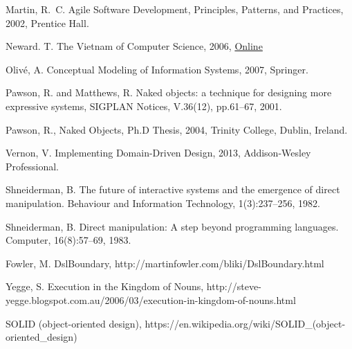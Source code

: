 \documentclass[a4paper,10pt,oneside,openright,final]{memoir} %
\begin{document}
\begin{thebibliography}{5}
Martin, R.~C. Agile Software Development, Principles, Patterns, and Practices, 2002, Prentice Hall.

New\-ard. T. The Vietnam of Computer Science, 2006,
\href{http://blogs.tedneward.com/2006/06/26/The+Vietnam+Of+Computer+Science.aspx}{Online}

Oliv\'{e}, A. Conceptual Modeling of Information Systems, 2007, Springer.

Pawson, R. and Matthews, R. Naked objects: a technique for designing more expressive systems, SIGPLAN Notices, V.36(12), pp.61--67, 2001.

Pawson, R., Naked Objects, Ph.D Thesis, 2004, Trinity College, Dublin, Ireland.

Vernon, V. Implementing Domain-Driven Design, 2013, Addison-Wesley Professional.

Shneiderman, B. The future of interactive systems and the emergence of direct manipulation. Behaviour and Information Technology, 1(3):237–256, 1982.

Shneiderman, B. Direct manipulation: A step beyond programming languages. Computer, 16(8):57–69, 1983.

 Fowler, M. DslBoundary, http://martinfowler.com/bliki/DslBoundary.html

 Yegge, S. Execution in the Kingdom of Nouns,  http://steve-yegge.blogspot.com.au/2006/03/execution-in-kingdom-of-nouns.html

 SOLID (object-oriented design), https://en.wikipedia.org/wiki/SOLID\_(object-oriented\_design)

\end{thebibliography}
%
\end{document}
